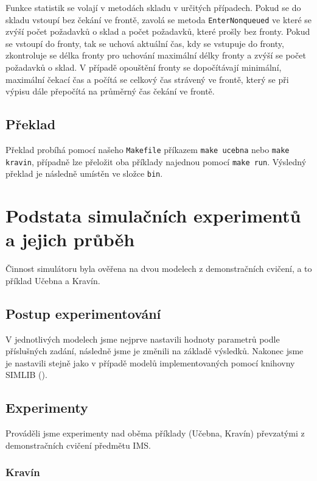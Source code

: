 \documentclass[12pt,a4paper,titlepage,final]{article}
\begin{document}
Funkce statistik se volají v metodách skladu v určitých případech. Pokud se do skladu vstoupí bez čekání ve frontě, zavolá se metoda \texttt{EnterNonqueued} ve které se zvýší počet požadavků o sklad a počet požadavků, které prošly bez fronty. Pokud se vstoupí do fronty, tak se uchová aktuální čas, kdy se vstupuje do fronty, zkontroluje se délka fronty pro uchování maximální délky fronty a zvýší se počet požadavků o sklad. V případě opouštění fronty se dopočítávají minimální, maximální čekací čas a počítá se celkový čas strávený ve frontě, který se při výpisu dále přepočítá na průměrný čas čekání ve frontě.

\subsection{Překlad}

Překlad probíhá pomocí našeho \texttt{Makefile} příkazem \texttt{make ucebna} nebo \texttt{make kravin}, případně lze přeložit oba příklady najednou pomocí \texttt{make run}. Výsledný překlad je následně umístěn ve složce \texttt{bin}.

\section{Podstata simulačních experimentů a jejich průběh}

Činnost simulátoru byla ověřena na dvou modelech z demonstračních cvičení, a to příklad Učebna a Kravín.

\subsection{Postup experimentování} 

V jednotlivých modelech jsme nejprve nastavili hodnoty parametrů podle příslušných zadání, následně jsme je změnili na základě výsledků. Nakonec jsme je nastavili stejně jako v případě modelů implementovaných pomocí knihovny SIMLIB (\cite{priklady}).

\subsection{Experimenty}

Prováděli jsme experimenty nad oběma příklady (Učebna, Kravín) převzatými z demonstračních cvičení předmětu IMS.

\subsubsection{ Kravín}
\end{document}

